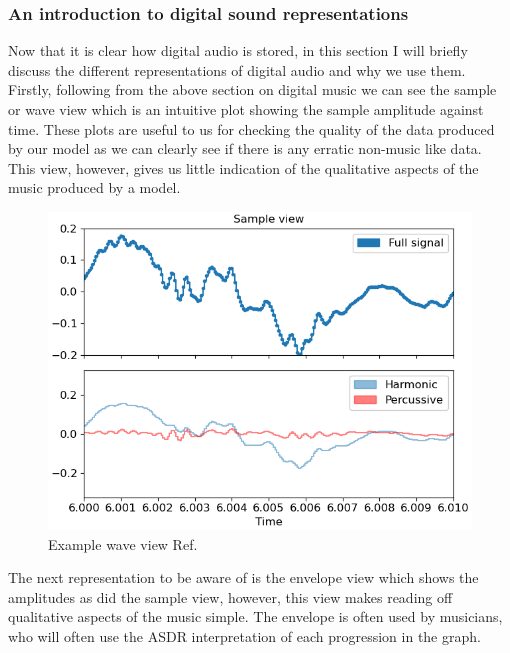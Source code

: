 \documentclass{article}
\begin{document}
\subsubsection{An introduction to digital sound representations}
Now that it is clear how digital audio is stored, in this section I will briefly discuss the different representations of digital audio and why we use them. \\
Firstly, following from the above section on digital music we can see the sample or wave view which is an intuitive plot showing the sample amplitude against time. These plots are useful to us for checking the quality of the data produced by our model as we can clearly see if there is any erratic non-music like data. This view, however, gives us little indication of the qualitative aspects of the music produced by a model. 
\begin{figure}[H]
\centering
\caption{Example wave view Ref. \cite{mcfee2015librosa}}
\includegraphics[scale=0.5]{librosa-display-waveshow-1_01.png}
\end{figure}
The next representation to be aware of is the envelope view which shows the amplitudes as did the sample view, however, this view makes reading off qualitative aspects of the music simple. The envelope is often used by musicians, who will often use the ASDR interpretation of each progression in the graph. \cite{vail_2013}
\end{document}

